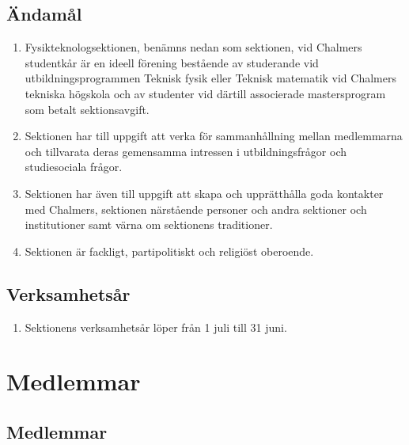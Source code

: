 \documentclass[11pt,a4paper]{article}
\begin{document}
\subsection{Ändamål}

\begin{enumerate}[\thesubsection .1]

  \item Fysikteknologsektionen, benämns nedan som sektionen, vid Chalmers studentkår är en ideell förening bestående av studerande vid utbildningsprogrammen Teknisk fysik eller Teknisk matematik vid Chalmers tekniska högskola och av studenter vid därtill associerade mastersprogram som betalt sektionsavgift.

  \item Sektionen har till uppgift att verka för samman\-hållning mellan
  med\-lem\-mar\-na och tillvarata deras gemensamma intressen i
  ut\-bild\-nings\-fråg\-or och studiesociala frågor.

  \item Sektionen har även till uppgift att skapa och upprätthålla
  goda kontakter med Chalmers, sektionen närstående personer och andra
  sektioner och institutioner samt värna om sektionens traditioner.

  \item Sektionen är fackligt, partipolitiskt och religiöst oberoende.

\end{enumerate}



\subsection{Verksamhetsår}

\begin{enumerate}[\thesubsection .1]

   \item Sektionens verksamhetsår löper från 1 juli till 31 juni.

\end{enumerate}

\newpage




\section{Medlemmar}
\subsection{Medlemmar}
\end{document}
